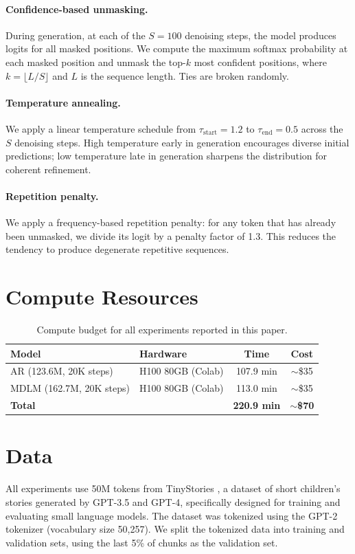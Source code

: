 \documentclass[11pt,a4paper]{article}
\begin{document}
\paragraph{Confidence-based unmasking.}
During generation, at each of the $S = 100$ denoising steps, the model produces logits for all masked positions.
We compute the maximum softmax probability at each masked position and unmask the top-$k$ most confident positions, where $k = \lfloor L / S \rfloor$ and $L$ is the sequence length.
Ties are broken randomly.

\paragraph{Temperature annealing.}
We apply a linear temperature schedule from $\tau_{\text{start}} = 1.2$ to $\tau_{\text{end}} = 0.5$ across the $S$ denoising steps.
High temperature early in generation encourages diverse initial predictions; low temperature late in generation sharpens the distribution for coherent refinement.

\paragraph{Repetition penalty.}
We apply a frequency-based repetition penalty: for any token that has already been unmasked, we divide its logit by a penalty factor of 1.3.
This reduces the tendency to produce degenerate repetitive sequences.

\section{Compute Resources}
\label{app:compute}

\begin{table}[H]
\centering
\caption{Compute budget for all experiments reported in this paper.}
\smallskip
\begin{tabular}{@{}llcc@{}}
\toprule
Model & Hardware & Time & Cost \\
\midrule
AR (123.6M, 20K steps) & H100 80GB (Colab) & 107.9 min & ${\sim}$\$35 \\
MDLM (162.7M, 20K steps) & H100 80GB (Colab) & 113.0 min & ${\sim}$\$35 \\
\midrule
\textbf{Total} & & \textbf{220.9 min} & $\boldsymbol{\sim}$\textbf{\$70} \\
\bottomrule
\end{tabular}
\end{table}

\section{Data}
\label{app:data}

All experiments use 50M tokens from TinyStories \citep{tinystories}, a dataset of short children's stories generated by GPT-3.5 and GPT-4, specifically designed for training and evaluating small language models.
The dataset was tokenized using the GPT-2 tokenizer (vocabulary size 50{,}257).
We split the tokenized data into training and validation sets, using the last 5\% of chunks as the validation set.
\end{document}
